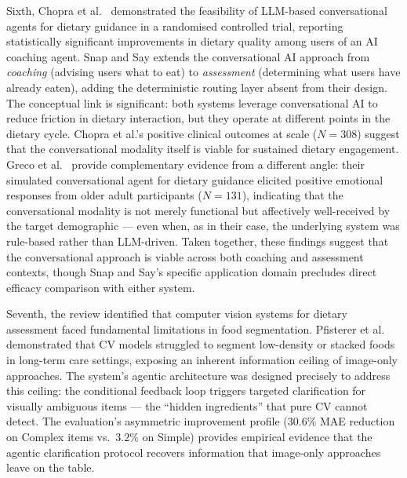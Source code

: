 Sixth, Chopra et al.\ \citep{chopraDigiMateLeveragingLarge2024} demonstrated the feasibility of LLM-based conversational agents for dietary guidance in a randomised controlled trial, reporting statistically significant improvements in dietary quality among users of an AI coaching agent. Snap and Say extends the conversational AI approach from \emph{coaching} (advising users what to eat) to \emph{assessment} (determining what users have already eaten), adding the deterministic routing layer absent from their design. The conceptual link is significant: both systems leverage conversational AI to reduce friction in dietary interaction, but they operate at different points in the dietary cycle. Chopra et al.'s positive clinical outcomes at scale ($N=308$) suggest that the conversational modality itself is viable for sustained dietary engagement. Greco et al.\ \citep{grecoEmotionalFeaturesInteractions2021} provide complementary evidence from a different angle: their simulated conversational agent for dietary guidance elicited positive emotional responses from older adult participants ($N=131$), indicating that the conversational modality is not merely functional but affectively well-received by the target demographic --- even when, as in their case, the underlying system was rule-based rather than LLM-driven. Taken together, these findings suggest that the conversational approach is viable across both coaching and assessment contexts, though Snap and Say's specific application domain precludes direct efficacy comparison with either system.

Seventh, the review identified that computer vision systems for dietary assessment faced fundamental limitations in food segmentation. Pfisterer et al.\ \citep{pfistererEnhancingFoodIntake2022} demonstrated that CV models struggled to segment low-density or stacked foods in long-term care settings, exposing an inherent information ceiling of image-only approaches. The system's agentic architecture was designed precisely to address this ceiling: the conditional feedback loop triggers targeted clarification for visually ambiguous items --- the ``hidden ingredients'' that pure CV cannot detect. The evaluation's asymmetric improvement profile ($30.6\%$ MAE reduction on Complex items vs.\ $3.2\%$ on Simple) provides empirical evidence that the agentic clarification protocol recovers information that image-only approaches leave on the table.

